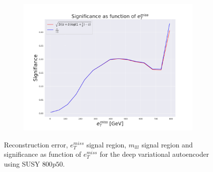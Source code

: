 \begin{figure}[H]
    \begin{subfigure}{.60\textwidth}
        \includegraphics[width=\textwidth]{Figures/VAE_testing/big/2lep/significance_etmiss_800p0p050_-0.7232197345309495.pdf}
        \caption{}
        \label{fig:VAE_2lep_big_signi_800}
    \end{subfigure}
    \hfill      
    \caption[2lep deep network | $800p50$ | VAE]{Reconstruction error, $e_T^{miss}$ signal region, $m_{lll}$ signal region and significance as function of 
    $e_T^{miss}$ for the deep variational autoencoder using SUSY $800p50$.}
    \label{fig:VAE_2lep_big_rec_sig_signi_800}
\end{figure}

